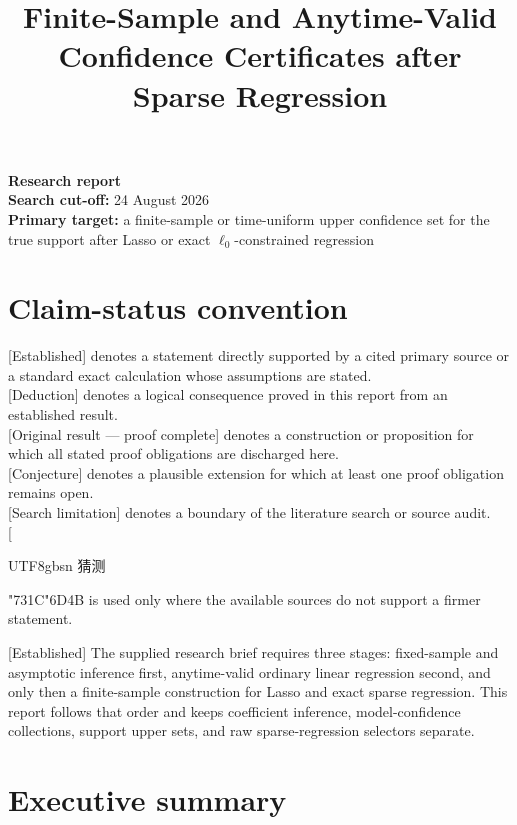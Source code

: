 \documentclass[
  english,
  11pt,
  a4paper,
]{article}
\title{Finite-Sample and Anytime-Valid Confidence Certificates after
Sparse Regression}
\author{}
\date{}
\begin{document}
\maketitle

\textbf{Research report}\\
\textbf{Search cut-off:} 24 August 2026\\
\textbf{Primary target:} a finite-sample or time-uniform upper
confidence set for the true support after Lasso or exact
$\ell_0$-constrained regression

{
\setcounter{tocdepth}{3}
\tableofcontents
}
\clearpage

\section{Claim-status convention}\label{claim-status-convention}

{[}Established{]} denotes a statement directly supported by a cited
primary source or a standard exact calculation whose assumptions are
stated.\\
{[}Deduction{]} denotes a logical consequence proved in this report from
an established result.\\
{[}Original result --- proof complete{]} denotes a construction or
proposition for which all stated proof obligations are discharged
here.\\
{[}Conjecture{]} denotes a plausible extension for which at least one
proof obligation remains open.\\
{[}Search limitation{]} denotes a boundary of the literature search or
source audit.\\
{[}\ifPDFTeX%
\begin{CJK*}{UTF8}{gbsn}%
猜测%
\end{CJK*}%
\else
{\cjkstatusfont\char"731C\char"6D4B}%
\fi{]} is used only where the available sources do not support a
firmer statement.

{[}Established{]} The supplied research brief requires three stages:
fixed-sample and asymptotic inference first, anytime-valid ordinary
linear regression second, and only then a finite-sample construction for
Lasso and exact sparse regression. This report follows that order and
keeps coefficient inference, model-confidence collections, support upper
sets, and raw sparse-regression selectors separate.

\section{Executive summary}\label{executive-summary}
\end{document}
